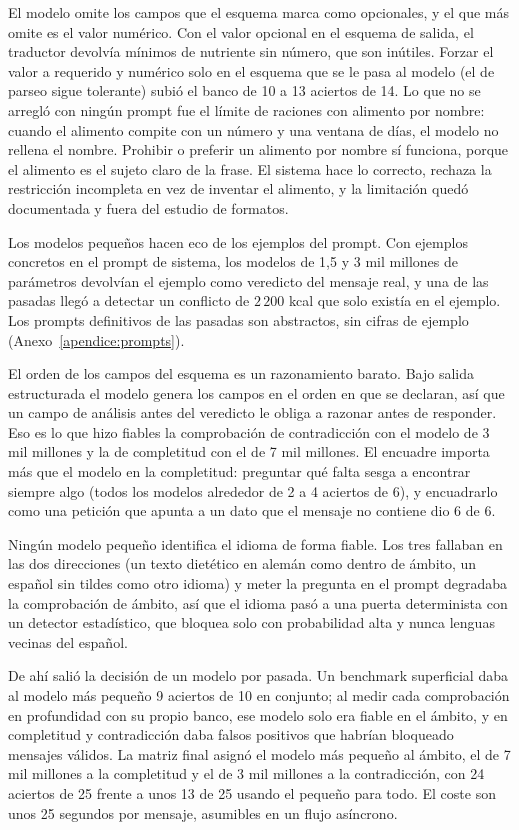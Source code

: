 El modelo omite los campos que el esquema marca como opcionales, y el que más omite es el valor numérico. Con el valor opcional en el esquema de salida, el traductor devolvía mínimos de nutriente sin número, que son inútiles. Forzar el valor a requerido y numérico solo en el esquema que se le pasa al modelo (el de parseo sigue tolerante) subió el banco de 10 a 13 aciertos de 14. Lo que no se arregló con ningún prompt fue el límite de raciones con alimento por nombre: cuando el alimento compite con un número y una ventana de días, el modelo no rellena el nombre. Prohibir o preferir un alimento por nombre sí funciona, porque el alimento es el sujeto claro de la frase. El sistema hace lo correcto, rechaza la restricción incompleta en vez de inventar el alimento, y la limitación quedó documentada y fuera del estudio de formatos.

Los modelos pequeños hacen eco de los ejemplos del prompt. Con ejemplos concretos en el prompt de sistema, los modelos de 1,5 y 3 mil millones de parámetros devolvían el ejemplo como veredicto del mensaje real, y una de las pasadas llegó a detectar un conflicto de $2\,200$ kcal que solo existía en el ejemplo. Los prompts definitivos de las pasadas son abstractos, sin cifras de ejemplo (Anexo~\ref{apendice:prompts}).

El orden de los campos del esquema es un razonamiento barato. Bajo salida estructurada el modelo genera los campos en el orden en que se declaran, así que un campo de análisis antes del veredicto le obliga a razonar antes de responder. Eso es lo que hizo fiables la comprobación de contradicción con el modelo de 3 mil millones y la de completitud con el de 7 mil millones. El encuadre importa más que el modelo en la completitud: preguntar qué falta sesga a encontrar siempre algo (todos los modelos alrededor de 2 a 4 aciertos de 6), y encuadrarlo como una petición que apunta a un dato que el mensaje no contiene dio 6 de 6.

Ningún modelo pequeño identifica el idioma de forma fiable. Los tres fallaban en las dos direcciones (un texto dietético en alemán como dentro de ámbito, un español sin tildes como otro idioma) y meter la pregunta en el prompt degradaba la comprobación de ámbito, así que el idioma pasó a una puerta determinista con un detector estadístico, que bloquea solo con probabilidad alta y nunca lenguas vecinas del español.

De ahí salió la decisión de un modelo por pasada. Un benchmark superficial daba al modelo más pequeño 9 aciertos de 10 en conjunto; al medir cada comprobación en profundidad con su propio banco, ese modelo solo era fiable en el ámbito, y en completitud y contradicción daba falsos positivos que habrían bloqueado mensajes válidos. La matriz final asignó el modelo más pequeño al ámbito, el de 7 mil millones a la completitud y el de 3 mil millones a la contradicción, con 24 aciertos de 25 frente a unos 13 de 25 usando el pequeño para todo. El coste son unos 25 segundos por mensaje, asumibles en un flujo asíncrono.

